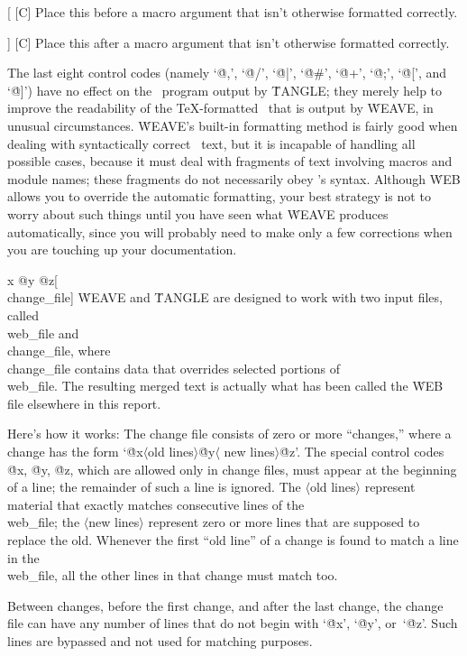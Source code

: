 \@{[} [C] Place this before a macro argument that isn't otherwise formatted
correctly.

\@] [C] Place this after a macro argument that isn't otherwise formatted
correctly.

\yskip\noindent
The last eight control codes (namely `\.{@,}', `\.{@/}', `\.{@|}', `\.{@\#}',
`\.{@+}', `\.{@;}', `\.{@[}', and `\.{@]}') have no effect on the \Cee\
program output by \.{TANGLE}; they merely help to improve the readability
of the \TeX-formatted \Cee\ that is output by \.{WEAVE}, in unusual
circumstances. \.{WEAVE}'s built-in formatting method is fairly good
when dealing with syntactically correct \Cee\ text, but
it is incapable of handling all possible cases, because it must deal with
fragments of text involving macros and module names; these fragments do
not necessarily obey \Cee's syntax. Although \.{WEB} allows you to
override the automatic formatting, your best strategy is not to worry
about such things until you have seen what \.{WEAVE} produces automatically,
since you will probably need to make only a few corrections when you are
touching up your documentation.

\@{x @y @z}[\\{change\_file}]
\.{WEAVE} and \.{TANGLE} are designed to work with two input files,
called \\{web\_file} and \\{change\_file}, where \\{change\_file} contains
data that overrides selected portions of \\{web\_file}. The resulting merged
text is actually what has been called the \.{WEB} file elsewhere in this
report.

\more Here's how it works: The change file consists of zero or more ``changes,''
where a change has the form `\.{@x}$\langle$old lines$\rangle$\.{@y}$\langle$%
new lines$\rangle$\.{@z}'. The special control codes \.{@x}, \.{@y}, \.{@z},
which are allowed only in change files, must appear at the beginning of a line;
the remainder of such a line is ignored.
The $\langle$old lines$\rangle$ represent material that exactly matches
consecutive lines of the \\{web\_file}; the $\langle$new lines$\rangle$
represent zero or more lines that are supposed to replace the old. Whenever
the first ``old line'' of a change is found to match a line in the
\\{web\_file}, all the other lines in that change must match too.

\more Between changes, before the first change, and after the last change,
the change file can have any number of lines that do not begin with
`\.{@x}', `\.{@y}', or~`\.{@z}'. Such lines are bypassed and not used for
matching purposes.

